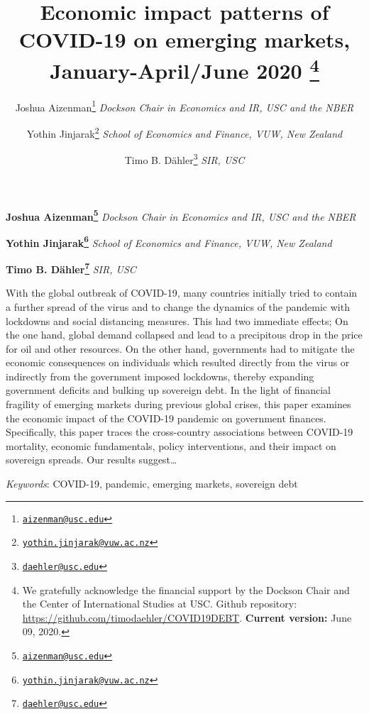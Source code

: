 \documentclass[11pt,]{article}
\title{Economic impact patterns of COVID-19 on emerging markets,
January-April/June 2020 \thanks{We gratefully acknowledge the financial support by the Dockson Chair and
the Center of International Studies at USC. Github repository:
\url{https://github.com/timodaehler/COVID19DEBT}. \textbf{Current
version:} June 09, 2020.}  }
\author{\Large Joshua Aizenman\footnote{\href{mailto:aizenman@usc.edu}{\nolinkurl{aizenman@usc.edu}}}\vspace{0.05in} \newline\normalsize\emph{Dockson Chair in Economics and IR, USC and the NBER}   \and \Large Yothin Jinjarak\footnote{\href{mailto:yothin.jinjarak@vuw.ac.nz}{\nolinkurl{yothin.jinjarak@vuw.ac.nz}}}\vspace{0.05in} \newline\normalsize\emph{School of Economics and Finance, VUW, New Zealand}   \and \Large Timo B. Dähler\footnote{\href{mailto:daehler@usc.edu}{\nolinkurl{daehler@usc.edu}}}\vspace{0.05in} \newline\normalsize\emph{SIR, USC}  }
\date{}
\newcommand*{\authorfont}{\fontfamily{phv}\selectfont}
\renewenvironment{abstract}
 {{%
    \setlength{\leftmargin}{0mm}
    \setlength{\rightmargin}{\leftmargin}%
  }%
  \relax}
 {\endlist}
\begin{document}
	
%

{%
\setlength{\parindent}{0pt}
\thispagestyle{plain}
{\fontsize{18}{20}\selectfont\raggedright 
\maketitle  %

}

{
   \vskip 13.5pt\relax \normalsize\fontsize{11}{12} 
\textbf{\authorfont Joshua Aizenman\footnote{\href{mailto:aizenman@usc.edu}{\nolinkurl{aizenman@usc.edu}}}} \hskip 15pt \emph{\small Dockson Chair in Economics and IR, USC and the NBER}   \par \textbf{\authorfont Yothin Jinjarak\footnote{\href{mailto:yothin.jinjarak@vuw.ac.nz}{\nolinkurl{yothin.jinjarak@vuw.ac.nz}}}} \hskip 15pt \emph{\small School of Economics and Finance, VUW, New Zealand}   \par \textbf{\authorfont Timo B. Dähler\footnote{\href{mailto:daehler@usc.edu}{\nolinkurl{daehler@usc.edu}}}} \hskip 15pt \emph{\small SIR, USC}   

}

}








\begin{abstract}

    \hbox{\vrule height .2pt width 39.14pc}

    \vskip 8.5pt %

\noindent With the global outbreak of COVID-19, many countries initially tried to
contain a further spread of the virus and to change the dynamics of the
pandemic with lockdowns and social distancing measures. This had two
immediate effects; On the one hand, global demand collapsed and lead to
a precipitous drop in the price for oil and other resources. On the
other hand, governments had to mitigate the economic consequences on
individuals which resulted directly from the virus or indirectly from
the government imposed lockdowns, thereby expanding government deficits
and bulking up sovereign debt. In the light of financial fragility of
emerging markets during previous global crises, this paper examines the
economic impact of the COVID-19 pandemic on government finances.
Specifically, this paper traces the cross-country associations between
COVID-19 mortality, economic fundamentals, policy interventions, and
their impact on sovereign spreads. Our results suggest\ldots{}


\vskip 8.5pt \noindent \emph{Keywords}: COVID-19, pandemic, emerging markets, sovereign debt \par

    \hbox{\vrule height .2pt width 39.14pc}



\end{abstract}
\end{document}
